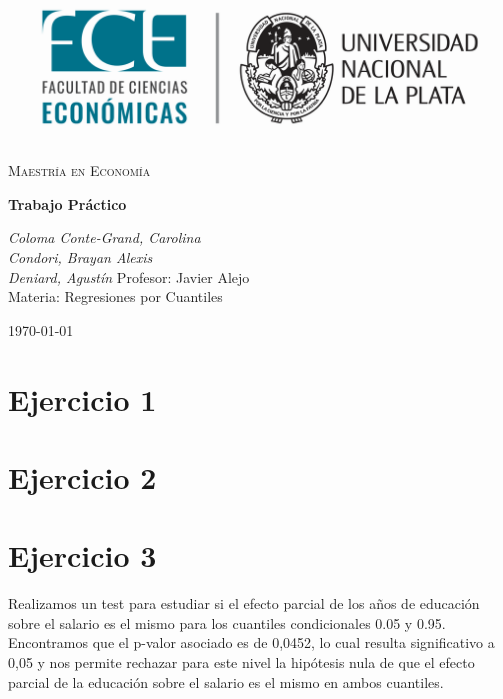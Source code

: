 \documentclass[12pt]{article}
\begin{document}
   


\begin{titlepage}
    \centering
    \vspace*{2cm}
    \includegraphics[width=1\textwidth]{logo.png} 
    
    \vspace{2cm}
    {\scshape\LARGE Maestría en Economía} \\
    
    \vspace{0.5cm}
    {\huge\bfseries
    Trabajo Práctico\par}
    \vspace{2cm}
    {\Large\itshape Coloma Conte-Grand, Carolina} \\
    
    {\Large\itshape Condori, Brayan Alexis} \\
    
    {\Large\itshape Deniard, Agustín}
    \vfill
    {\large Profesor: Javier Alejo} \\
    {\large Materia: Regresiones por Cuantiles}

    \vfill

    {\large \today\par}
\end{titlepage}

\justify 

\section*{Ejercicio 1}

\section*{Ejercicio 2}

\section*{Ejercicio 3}

Realizamos un test para estudiar si el efecto parcial de los años de educación sobre el salario es el mismo para los cuantiles condicionales 0.05 y 0.95. Encontramos que el p-valor asociado es de 0,0452, lo cual resulta significativo a 0,05 y nos permite rechazar para este nivel la hipótesis nula de que el efecto parcial de la educación sobre el salario es el mismo en ambos cuantiles.
\end{document}
